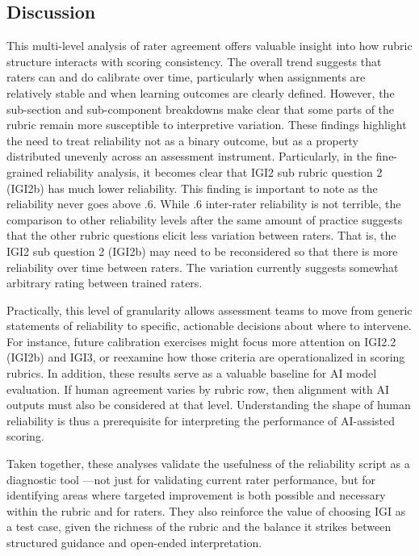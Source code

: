 \documentclass[12pt]{article}%
\begin{document}
\subsection*{Discussion}

This multi-level analysis of rater agreement offers valuable insight into how rubric structure interacts with scoring consistency. The overall trend suggests that raters can and do calibrate over time, particularly when assignments are relatively stable and when learning outcomes are clearly defined. However, the sub-section and sub-component breakdowns make clear that some parts of the rubric remain more susceptible to interpretive variation. These findings highlight the need to treat reliability not as a binary outcome, but as a property distributed unevenly across an assessment instrument. Particularly, in the fine-grained reliability analysis, it becomes clear that IGI2 sub rubric question 2 (IGI2b) has much lower reliability. This finding is important to note as the reliability never goes above .6. While .6 inter-rater reliability is not terrible, the comparison to other reliability levels after the same amount of practice suggests that the other rubric questions elicit less variation between raters. That is, the IGI2 sub question 2 (IGI2b) may need to be reconsidered so that there is more reliability over time between raters. The variation currently suggests somewhat arbitrary rating between trained raters. 

Practically, this level of granularity allows assessment teams to move from generic statements of reliability to specific, actionable decisions about where to intervene. For instance, future calibration exercises might focus more attention on IGI2.2 (IGI2b) and IGI3, or reexamine how those criteria are operationalized in scoring rubrics. In addition, these results serve as a valuable baseline for AI model evaluation. If human agreement varies by rubric row, then alignment with AI outputs must also be considered at that level. Understanding the shape of human reliability is thus a prerequisite for interpreting the performance of AI-assisted scoring.

Taken together, these analyses validate the usefulness of the reliability script as a diagnostic tool —not just for validating current rater performance, but for identifying areas where targeted improvement is both possible and necessary within the rubric and for raters. They also reinforce the value of choosing IGI as a test case, given the richness of the rubric and the balance it strikes between structured guidance and open-ended interpretation.
\end{document}
